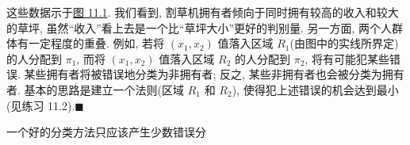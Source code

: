 这些数据示于\hyperref[fig:11.1]{图 11.1}. 我们看到, 割草机拥有者倾向于同时拥有较高的收入和较大的草坪, 虽然“收入”看上去是一个比“草坪大小”更好的判别量. 另一方面, 两个人群体有一定程度的重叠. 例如, 若将 $(x_1,x_2)$ 值落入区域 $R_1$(由图中的实线所界定)的人分配到 $\pi_1$, 而将 $(x_1,x_2)$ 值落入区域 $R_2$ 的人分配到 $\pi_2$, 将有可能犯某些错误. 某些拥有者将被错误地分类为非拥有者; 反之, 某些非拥有者也会被分类为拥有者. 基本的思路是建立一个法则(区域 $R_1$ 和 $R_2$), 使得犯上述错误的机会达到最小(见练习 11.2).\hfill$\blacksquare$

一个好的分类方法只应该产生少数错误分

\begin{mvfigure}
\label{fig:11.1}
\end{mvfigure}
